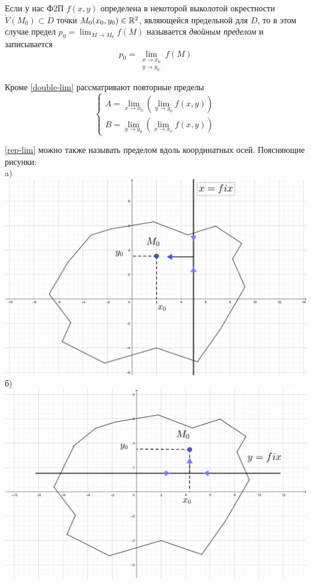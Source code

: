 \documentclass[../../main.tex]{subfiles}
\begin{document}
Если у нас Ф2П $f(x, y)$ определена в некоторой выколотой окрестности 
$\dot{V}(M_0) \subset D$ точки $M_0(x_0, y_0) \in \mathbb{R}^2$, являющейся предельной для $D$,
то в этом случае  предел $p_0 = \displaystyle \lim_{M \to M_0}{f(M)}$ называется
\emph{двойным пределом} и записывается 
\begin{equation}
\label{double-lim}
p_0 = \underset{\substack{
	x \to x_0 \\
	y \to y_0
}}{\lim}f(M)
\end{equation}

Кроме \eqref{double-lim} рассматривают повторные пределы
\begin{equation}
\label{rep-lim}
	\left\{\begin{aligned}
		A = \displaystyle\lim_{x \to x_0}{(\lim_{y \to y_0}{f(x, y)})} \\
		B = \displaystyle\lim_{y \to y_0}{(\lim_{x \to x_0}{f(x, y)})} 
	\end{aligned}\right.
\end{equation}

\eqref{rep-lim} можно также называть пределом вдоль координатных осей.
Поясняющие рисунки: \\
a) 
\includegraphics[scale=0.33]{rep-lim-case-a.png}
б) 
\includegraphics[scale=0.33]{rep-lim-case-b.png}
\end{document}

